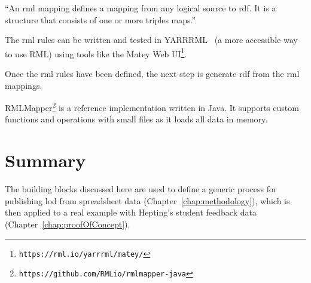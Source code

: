 \begin{doublespace}
``An \ac{rml} mapping defines a mapping from any logical source to \ac{rdf}. 
It is a structure that consists of one or more triples maps.''~\cite{dimou_ldow_2014}

The \ac{rml} rules can be written and tested in YARRRML~\cite{yarrrml2018} 
(a more accessible way to use RML)
using tools like the Matey Web UI\footnote{\tt https://rml.io/yarrrml/matey/}.

Once the \ac{rml} rules have been defined, 
the next step is generate \ac{rdf} 
from the \ac{rml} mappings. 

    RMLMapper\footnote{\tt https://github.com/RMLio/rmlmapper-java} 
    is a reference implementation written in Java. 
    It supports custom functions and operations 
    with small files as it loads all data in memory. 
    
\section{Summary}

The building blocks discussed here are used
to define a generic process for publishing \ac{lod} from spreadsheet data (Chapter~\ref{chap:methodology}),
which is then applied to a real example with Hepting's student feedback data
(Chapter~\ref{chap:proofOfConcept}).
\end{doublespace}

